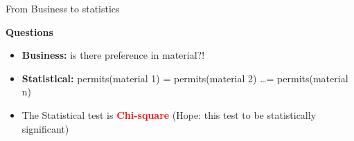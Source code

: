\documentclass[8pt]{beamer}
\begin{document}
        \begin{frame}{From Business to statistics}
            \begin{block}{\textbf{Questions}}
                \begin{itemize}
                    \item \textbf{Business:} is there preference in material?!
                    \item \textbf{Statistical:} permits(material 1) = permits(material 2) \ldots = permits(material n)
                    \item The Statistical test is \textcolor{red}{\textbf{Chi-square}} (Hope: this test to be statistically significant)
                \end{itemize}
            \end{block}


\end{frame}
\end{document}
